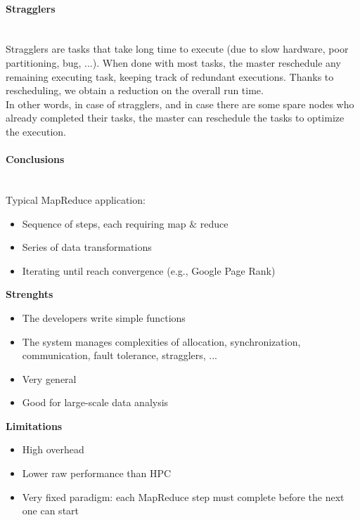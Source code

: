 \documentclass[10pt,a4paper]{article}
\newcommand{\myparagraph}[1]{\paragraph{#1}\mbox{}\\[0.05in]}
\begin{document}
\myparagraph{Stragglers}
Stragglers are tasks that take long time to execute (due to slow hardware, poor partitioning, bug, ...). When done with most tasks, the master reschedule any remaining executing task, keeping track of redundant executions. Thanks to rescheduling, we obtain a reduction on the overall run time. \\ In other words, in case of stragglers, and in case there are some spare nodes who already completed their tasks, the master can reschedule the tasks to optimize the execution.
\myparagraph{Conclusions}
Typical MapReduce application:
\begin{itemize}
	\item Sequence of steps, each requiring map $\&$ reduce
	\item Series of data transformations
	\item Iterating until reach convergence (e.g., Google Page Rank)
\end{itemize}
\textbf{Strenghts}
\begin{itemize}
	\item The developers write simple functions
	\item The system manages complexities of allocation, synchronization, communication, fault tolerance, stragglers, ...
	\item Very general
	\item Good for large-scale data analysis
\end{itemize}
\textbf{Limitations}
\begin{itemize}
	\item High overhead
	\item Lower raw performance than HPC
	\item Very fixed paradigm: each MapReduce step must complete before the next one can start
\end{itemize}
\end{document}
